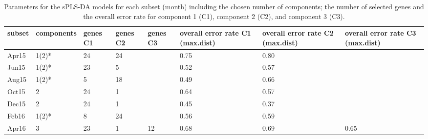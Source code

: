 \begin{table}[]
\caption{Parameters for the sPLS-DA models for each subset (month) including
the chosen number of components; the number of selected genes and the overall
error rate for component 1 (C1), component 2 (C2), and component 3 (C3).}
\label{pub3_table2}
\begin{tabular}{@{}llllllll@{}}
\toprule
\textbf{subset} & \textbf{components} & \textbf{genes C1} & \textbf{genes C2} & \textbf{genes C3} & \textbf{overall error rate C1 (max.dist)} & \textbf{overall error rate C2 (max.dist)} & \textbf{overall error rate C3 (max.dist)} \\ \midrule
Apr15           & 1(2)*               & 24                & 24                &                   & 0.75                                      & 0.80                                      &                                           \\
Jun15           & 1(2)*               & 23                & 5                 &                   & 0.52                                      & 0.57                                      &                                           \\
Aug15           & 1(2)*               & 5                 & 18                &                   & 0.49                                      & 0.66                                      &                                           \\
Oct15           & 2                   & 24                & 1                 &                   & 0.64                                      & 0.57                                      &                                           \\
Dec15           & 2                   & 24                & 1                 &                   & 0.45                                      & 0.37                                      &                                           \\
Feb16           & 1(2)*               & 8                 & 24                &                   & 0.56                                      & 0.59                                      &                                           \\
Apr16           & 3                   & 23                & 1                 & 12                & 0.68                                      & 0.69                                      & 0.65                                      \\ \bottomrule
\end{tabular}
\end{table}


